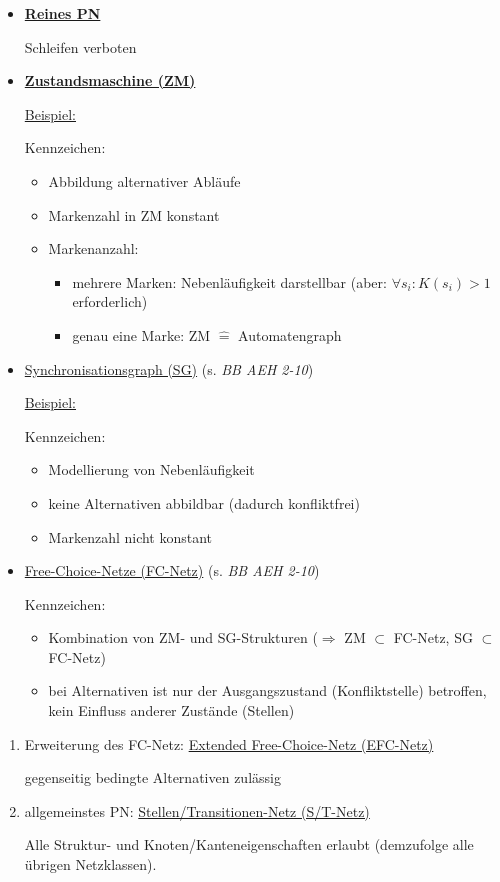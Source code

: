 \begin{itemize}
	\item \textbf{\underline{Reines PN}}
	
	Schleifen verboten
	
	\item \textbf{\underline{Zustandsmaschine (ZM)}}
	
	\underline{Beispiel:}
	
	Kennzeichen:
	\begin{itemize}
		\item Abbildung alternativer Abläufe
		\item Markenzahl in ZM konstant
		\item Markenanzahl:
		\begin{itemize}
			\item mehrere Marken: Nebenläufigkeit darstellbar (aber: $\forall s_i: K(s_i)>1$ erforderlich)
			\item genau eine Marke: ZM $\hat{=}$ Automatengraph
		\end{itemize}
	\end{itemize}

	\item \underline{Synchronisationsgraph (SG)} (s. \textit{BB AEH 2-10})
	
	\underline{Beispiel:}
	
	Kennzeichen:
	\begin{itemize}
		\item Modellierung von Nebenläufigkeit
		\item keine Alternativen abbildbar (dadurch konfliktfrei)
		\item Markenzahl nicht konstant
	\end{itemize}

	\item \underline{Free-Choice-Netze (FC-Netz)} (s. \textit{BB AEH 2-10})
	
	Kennzeichen:
	\begin{itemize}
		\item Kombination von ZM- und SG-Strukturen \newline ($\Rightarrow$ ZM $\subset$ FC-Netz, SG $\subset$ FC-Netz)
		\item bei Alternativen ist nur der Ausgangszustand (Konfliktstelle) betroffen, kein Einfluss anderer Zustände (Stellen)
	\end{itemize}
\end{itemize}

\begin{enumerate}
	\item Erweiterung des FC-Netz: \underline{Extended Free-Choice-Netz (EFC-Netz)}
	
	gegenseitig bedingte Alternativen zulässig
	
	\item allgemeinstes PN: \underline{Stellen/Transitionen-Netz (S/T-Netz)}
	
	Alle Struktur- und Knoten/Kanteneigenschaften erlaubt (demzufolge alle übrigen Netzklassen).
\end{enumerate}

